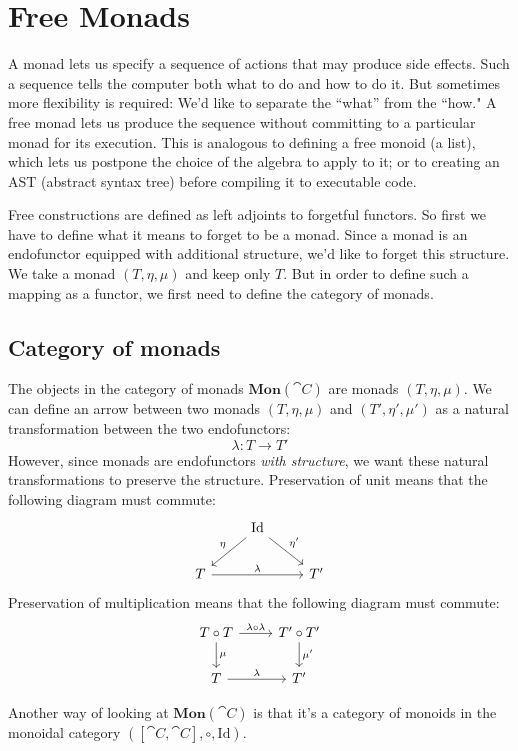\documentclass[DaoFP]{subfiles}
\begin{document}
\section{Free Monads}

A monad lets us specify a sequence of actions that may produce side effects. Such a sequence tells the computer both what to do and how to do it. But sometimes more flexibility is required: We'd like to separate the ``what'' from the ``how." A free monad lets us produce the sequence without committing to a particular monad for its execution. This is analogous to defining a free monoid (a list), which lets us postpone the choice of the algebra to apply to it; or to creating an AST (abstract syntax tree) before compiling it to executable code.

Free constructions are defined as left adjoints to forgetful functors. So first we have to define what it means to forget to be a monad. Since a monad is an endofunctor equipped with additional structure, we'd like to forget this structure. We take a monad $(T, \eta, \mu)$ and keep only $T$. But in order to define such a mapping as a functor, we first need to define the category of monads.

\subsection{Category of monads}

The objects in the category of monads $\mathbf{Mon}(\cat C)$ are monads $(T, \eta, \mu)$. We can define an arrow between two monads $(T, \eta, \mu)$ and $(T', \eta', \mu')$ as a natural transformation between the two endofunctors:
\[ \lambda \colon T \to T' \]
However, since monads are endofunctors \emph{with structure}, we want these natural transformations to preserve the structure. Preservation of unit means that the following diagram must commute:
\[
 \begin{tikzcd}
&\text{Id}
 \arrow[ld, "\eta"']
 \arrow[rd, "\eta'"]
 \\
 T
 \arrow[rr, "\lambda"]
 && T'
 \end{tikzcd}
\]
Preservation of multiplication means that the following diagram must commute:
\[
 \begin{tikzcd}
 T \circ T
 \arrow[r, "\lambda \circ \lambda"]
 \arrow[d, "\mu"]
 & T' \circ T'
 \arrow[d, "\mu'"]
 \\
 T
 \arrow[r, "\lambda"]
 & T'
 \end{tikzcd}
\]

Another way of looking at $\mathbf{Mon}(\cat C)$ is that it's a category of monoids in the monoidal category $([\cat C, \cat C], \circ, \text{Id})$. 
\end{document}
